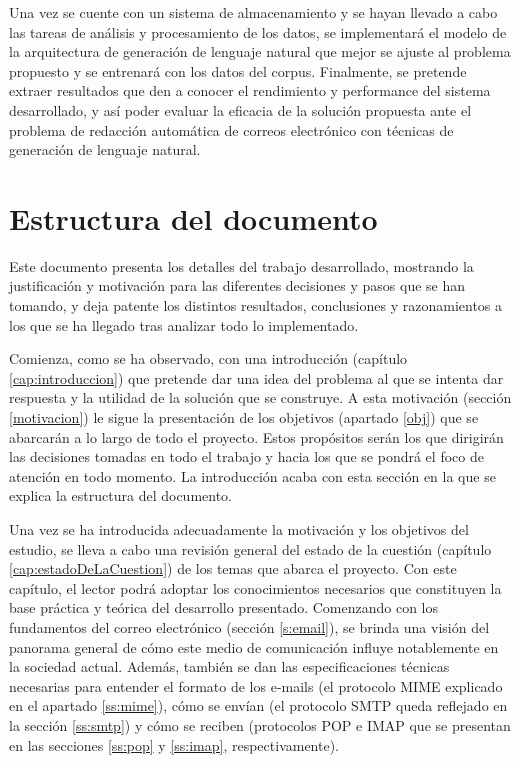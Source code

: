 Una vez se cuente con un sistema de almacenamiento y se hayan llevado a cabo las tareas de análisis y procesamiento de los datos, se implementará el modelo de la arquitectura de generación de lenguaje natural que mejor se ajuste al problema propuesto y se entrenará con los datos del corpus. Finalmente, se pretende extraer resultados que den a conocer el rendimiento y performance del sistema desarrollado, y así poder evaluar la eficacia de la solución propuesta ante el problema de redacción automática de correos electrónico con técnicas de generación de lenguaje natural.

\section{Estructura del documento}\label{estructura}
Este documento presenta los detalles del trabajo desarrollado, mostrando la justificación y motivación para las diferentes decisiones y pasos que se han tomando, y deja patente los distintos resultados, conclusiones y razonamientos a los que se ha llegado tras analizar todo lo implementado.

Comienza, como se ha observado, con una introducción (capítulo \ref{cap:introduccion}) que pretende dar una idea del problema al que se intenta dar respuesta y la utilidad de la solución que se construye. A esta motivación (sección \ref{motivacion}) le sigue la presentación de los objetivos (apartado \ref{obj}) que se abarcarán a lo largo de todo el proyecto. Estos propósitos serán los que dirigirán las decisiones tomadas en todo el trabajo y hacia los que se pondrá el foco de atención en todo momento. La introducción acaba con esta sección en la que se explica la estructura del documento.

Una vez se ha introducida adecuadamente la motivación y los objetivos del estudio, se lleva a cabo una revisión general del estado de la cuestión (capítulo \ref{cap:estadoDeLaCuestion}) de los temas que abarca el proyecto. Con este capítulo, el lector podrá adoptar los conocimientos necesarios que constituyen la base práctica y teórica del desarrollo presentado. Comenzando con los fundamentos del correo electrónico (sección \ref{s:email}), se brinda una visión del panorama general de cómo este medio de comunicación influye notablemente en la sociedad actual. Además, también se dan las especificaciones técnicas necesarias para entender el formato de los e-mails (el protocolo MIME explicado en el apartado \ref{ss:mime}), cómo se envían (el protocolo SMTP queda reflejado en la sección \ref{ss:smtp}) y cómo se reciben (protocolos POP e IMAP que se presentan en las secciones \ref{ss:pop} y \ref{ss:imap}, respectivamente).

